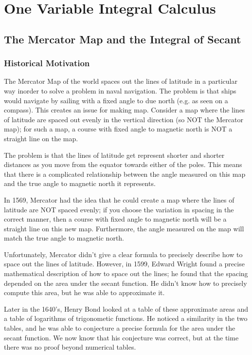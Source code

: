 \section{One Variable Integral Calculus}

\subsection{The Mercator Map and the Integral of Secant}

\subsubsection*{Historical Motivation}

The Mercator Map of the world spaces out the lines of latitude in a particular way inorder to solve a problem in naval navigation. 
The problem is that ships would navigate by sailing with a fixed angle to due north (e.g. as seen on a compass). 
This creates an issue for making map. 
Consider a map where the lines of latitude are spaced out evenly in the vertical direction (so NOT the Mercator map); for such a map, a course with fixed angle to magnetic north is NOT a straight line on the map.  

The problem is that the lines of latitude get represent shorter and shorter distances as you move from the equator towards either of the poles. 
This means that there is a complicated relationship between the angle measured on this map and the true angle to magnetic north it represents.

In 1569, Mercator had the idea that he could create a map where the lines of latitude are NOT spaced evenly; if you choose the variation in spacing in the correct manner, then a course with fixed angle to magnetic north will be a straight line on this new map. 
Furthermore, the angle measured on the map will match the true angle to magnetic north.

Unfortunately, Mercator didn't give a clear formula to precisely describe how to space out the lines of latitude. 
However, in 1599, Edward Wright found a precise mathematical description of how to space out the lines; he found that the spacing depended on the area under the secant function.
He didn't know how to precisely compute this area, but he was able to approximate it. 

Later in the 1640's, Henry Bond looked at a table of these approximate areas and a table of logarithms of trigonometic functions. 
He noticed a similarity in the two tables, and he was able to conjecture a precise formula for the area under the secant function. 
We now know that his conjecture was correct, but at the time there was no proof beyond numerical tables.

